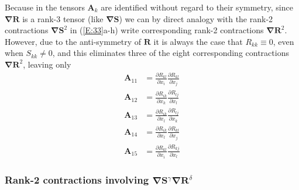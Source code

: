 Because in  the tensors $\mathbf{A}_k$  are identified without regard to their symmetry, since $\mathbf{\nabla R}$ is a rank-3 tensor (like $\mathbf{\nabla S}$) we can by direct analogy with the rank-2 contractions $\mathbf{\nabla S}^2$  in (\ref{E:33}a-h) write corresponding rank-2 contractions $\mathbf{\nabla R}^2$.  However, due to the anti-symmetry of $\mathbf{R}$ it is always the case that $R_{kk} \equiv 0$, even when $S_{kk} \neq 0$, and this eliminates three of the eight corresponding contractions $\mathbf{\nabla R}^2$, leaving only
%
\begin{subequations}
\label{E:34}
\begin{align}
	\mathbf{A}_{11}  &= \frac{\partial R_{kl}}{\partial x_i}
					  \frac{\partial R_{kl}}{\partial x_j} \\
	\mathbf{A}_{12}  &= \frac{\partial R_{ik}}{\partial x_k}
					  \frac{\partial R_{lj}}{\partial x_l} \\
	\mathbf{A}_{13}  &= \frac{\partial R_{ik}}{\partial x_l}
					  \frac{\partial R_{lj}}{\partial x_k} \\
	\mathbf{A}_{14}  &= \frac{\partial R_{ik}}{\partial x_l}
					  \frac{\partial R_{kl}}{\partial x_j} \\
	\mathbf{A}_{15}  &= \frac{\partial R_{kl}}{\partial x_i}
				      \frac{\partial R_{kj}}{\partial x_l}    
\end{align}
\end{subequations}
%
%    
	 
\subsubsection{Rank-2 contractions involving $\mathbf{\nabla S}^{\gamma} \mathbf{\nabla R}^{\delta}$}
\label{sec:2C3}

